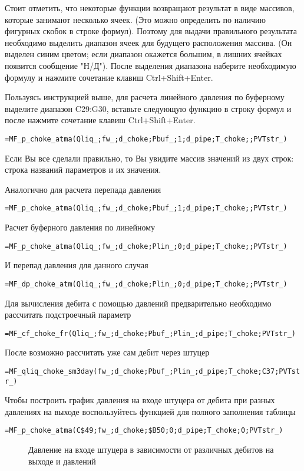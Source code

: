 Стоит отметить, что некоторые функции возвращают результат в виде массивов, которые занимают несколько ячеек. (Это можно определить по наличию фигурных скобок в строке формул). Поэтому для выдачи правильного результата необходимо выделить диапазон ячеек для будущего расположения массива. (Он выделен синим цветом; если диапазон окажется большим, в лишних ячейках появится сообщение "Н/Д"). После выделения диапазона наберите необходимую формулу и нажмите сочетание клавиш Ctrl+Shift+Enter.

Пользуясь инструкцией выше, для расчета линейного давления по буферному выделите диапазон C29:G30, вставьте следующую функцию в строку формул и после нажмите сочетание клавиш Ctrl+Shift+Enter.

{ \small  \texttt{=MF\_p\_choke\_atma(Qliq\_;fw\_;d\_choke;Pbuf\_;1;d\_pipe;T\_choke;;PVTstr\_)}}

Если Вы все сделали правильно, то Вы увидите массив значений из двух строк: строка названий параметров и их значения.

Аналогично для расчета перепада давления 

{ \small  \texttt{=MF\_p\_choke\_atma(Qliq\_;fw\_;d\_choke;Pbuf\_;1;d\_pipe;T\_choke;;PVTstr\_)}}

Расчет буферного давления по линейному

{ \small  \texttt{=MF\_p\_choke\_atma(Qliq\_;fw\_;d\_choke;Plin\_;0;d\_pipe;T\_choke;;PVTstr\_)
}}

И перепад давления для данного случая

{ \small  \texttt{=MF\_dp\_choke\_atm(Qliq\_;fw\_;d\_choke;Plin\_;0;d\_pipe;T\_choke;;PVTstr\_)
}}

Для вычисления дебита с помощью давлений предварительно необходимо рассчитать подстроечный параметр

{ \small  \texttt{=MF\_cf\_choke\_fr(Qliq\_;fw\_;d\_choke;Pbuf\_;Plin\_;d\_pipe;T\_choke;PVTstr\_)
}}

После возможно рассчитать уже сам дебит через штуцер

{ \small  \texttt{=MF\_qliq\_choke\_sm3day(fw\_;d\_choke;Pbuf\_;Plin\_;d\_pipe;T\_choke;C37;PVTstr\_)
}}

Чтобы построить график давления на входе штуцера от дебита при разных давлениях на выходе воспользуйтесь функцией для полного заполнения таблицы

{ \small  \texttt{=MF\_p\_choke\_atma(C\$49;fw\_;d\_choke;\$B50;0;d\_pipe;T\_choke;0;PVTstr\_)
}}


\begin{figure}[h!]
	\center{\texttt{[image: Ex40\_3]}}
	\caption{Давление на входе штуцера в зависимости от различных дебитов на выходе и давлений}
	\label{ris:Ex40_3}
\end{figure}


